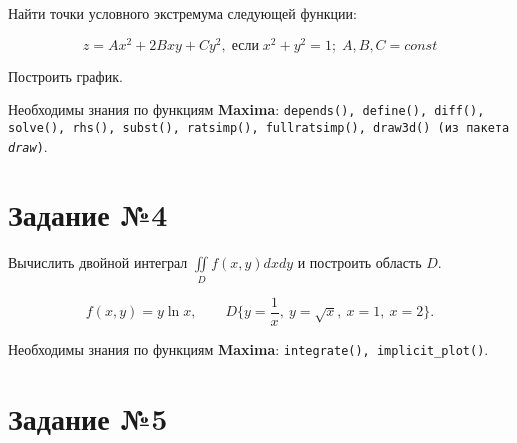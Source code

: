 	Найти точки условного экстремума следующей функции:

	\[
		z = A x^{2} + 2 B x y + C y^{2}, \; \mbox{если} \; x^{2} + y^{2} = 1; \; A,B,C = const
	\]

	Построить график.

	Необходимы знания по функциям \textbf{Maxima}: {\tt depends(), define(), diff(), solve(), rhs(), subst(), ratsimp(), fullratsimp(), draw3d() (из пакета \textit{draw})}.

\section*{Задание №4}

    Вычислить двойной интеграл $\iint\limits_{D} f(x,y) dx dy$ и построить область $D$.

    \[
        f(x,y) = y \ln{x}, \qquad D \{ y = \frac{1}{x}, \: y = \sqrt{x}, \: x = 1, \: x = 2 \}.
    \]

    Необходимы знания по функциям \textbf{Maxima}: {\tt integrate(), implicit\_plot()}.

%
%
%
%

\section*{Задание №5}

